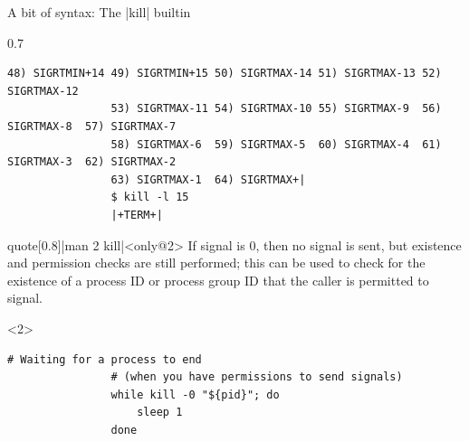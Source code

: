 \begin{frame}[fragile]{A bit of syntax: The \bash|kill| builtin}
\begin{overlayarea}{\textwidth}{0.7\textheight}
\begin{onlyenv}
\begin{lstlisting}[style=MyBash, style=smaller, numbers=none, xleftmargin=1mm]
                48) SIGRTMIN+14 49) SIGRTMIN+15 50) SIGRTMAX-14 51) SIGRTMAX-13 52) SIGRTMAX-12
                53) SIGRTMAX-11 54) SIGRTMAX-10 55) SIGRTMAX-9  56) SIGRTMAX-8  57) SIGRTMAX-7
                58) SIGRTMAX-6  59) SIGRTMAX-5  60) SIGRTMAX-4  61) SIGRTMAX-3  62) SIGRTMAX-2
                63) SIGRTMAX-1  64) SIGRTMAX+|
                $ kill -l 15
                |+TERM+|
            \end{lstlisting}
        \end{onlyenv}
        \vspace{-2mm}
        \begin{varblock}{quote}[0.8\textwidth]{\bash|man 2 kill|}<only@2>
            If signal is 0, then no signal is sent, but existence and permission checks are still performed; this can be used to check for the existence of a process ID or process group ID that the caller is permitted to signal.
        \end{varblock}
        \begin{onlyenv}<2>
            \begin{lstlisting}[style=MyBash, aboveskip=2mm]
                # Waiting for a process to end
                # (when you have permissions to send signals)
                while kill -0 "${pid}"; do
                    sleep 1
                done
            \end{lstlisting}
        \end{onlyenv}
    \end{overlayarea}
\end{frame}
